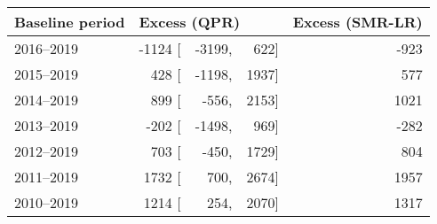 \begin{tabular}{lrrrr} 
\hline
Baseline period & \multicolumn{3}{l}{Excess (QPR)} & Excess (SMR-LR) \\ 
\hline
2016--2019    &    -1124 [ & -3199, & 622]   &   -923 \\ 
2015--2019    &    428 [ & -1198, & 1937]   &   577 \\ 
2014--2019    &    899 [ & -556, & 2153]   &   1021 \\ 
2013--2019    &    -202 [ & -1498, & 969]   &   -282 \\ 
2012--2019    &    703 [ & -450, & 1729]   &   804 \\ 
2011--2019    &    1732 [ & 700, & 2674]   &   1957 \\ 
2010--2019    &    1214 [ & 254, & 2070]   &   1317 \\ 
\hline
\end{tabular}

